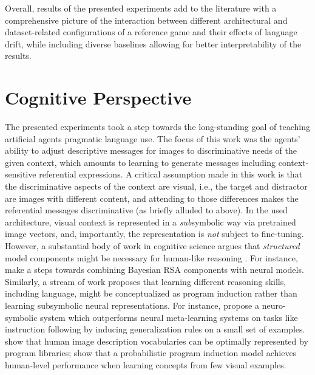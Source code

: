Overall, results of the presented experiments add to the literature with a comprehensive picture of the interaction between different architectural and dataset-related configurations of a reference game and their effects of language drift, while including diverse baselines allowing for better interpretability of the results. 


\section{Cognitive Perspective}
\label{discussion_cog_perspective}
The presented experiments took a step towards the long-standing goal of teaching artificial agents pragmatic language use. The focus of this work was the agents' ability to adjust descriptive messages for images to discriminative needs of the given context, which amounts to learning to generate messages including context-sensitive referential expressions. A critical assumption made in this work is that the discriminative aspects of the context are visual, i.e., the target and distractor are images with different content, and attending to those differences makes the referential messages discriminative (as briefly alluded to above). In the used architecture, visual context is represented in a \emph{sub}symbolic way via pretrained image vectors, and, importantly, the representation is \emph{not} subject to fine-tuning. However, a substantial body of work in cognitive science argues that \emph{structured} model components might be necessary for human-like reasoning \parencite[e.~g.,][]{tenenbaum2011grow, lake2017building}. For instance, \cite{monroe2015learning} make a steps towards combining Bayesian RSA components with neural models.
Similarly, a stream of work proposes that learning different reasoning skills, including language, might be conceptualized as program induction rather than learning subsymbolic neural representations. For instance, \cite{nye2020learning} propose a neuro-symbolic system which outperforms neural meta-learning systems on tasks like instruction following by inducing generalization rules on a small set of examples. \cite{wong2022identifying} show that human image description vocabularies can be optimally represented by program libraries; \cite{lake2015human} show that a probabilistic program induction model achieves human-level performance when learning concepts from few visual examples. 

